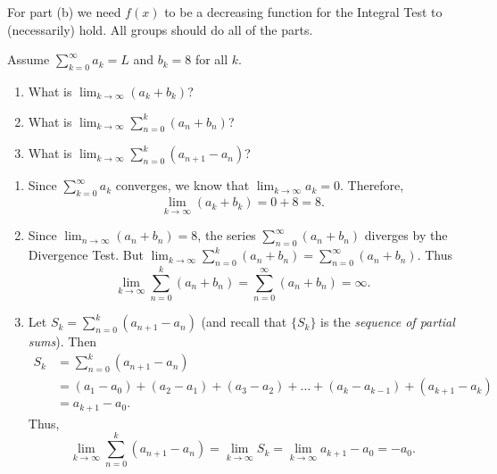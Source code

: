 \documentclass[]{ximera}
\begin{document}
\begin{instructorNotes}
For part (b) we need $f(x)$ to be a decreasing function for the Integral Test to (necessarily) hold.
All groups should do all of the parts.
\end{instructorNotes}







\begin{problem}
Assume $\sum_{k=0}^\infty a_k =L$ and $b_k = 8$ for all $k$. 
	\begin{enumerate}
	
	\item  What is $\lim_{k \to \infty} (a_k + b_k)$?
	
	\item  What is $\lim_{k \to \infty} \sum_{n=0}^k (a_n + b_n)$?
	
	\item  What is $\lim_{k \to \infty} \sum_{n=0}^k (a_{n+1} - a_n)$?
	
	\end{enumerate}
	
	\begin{freeResponse}
		\begin{enumerate}
	
		\item  Since $\sum_{k=0}^\infty a_k$ converges, we know that $\lim_{k \to \infty} a_k = 0$.  
		Therefore,
			\[
			\lim_{k \to \infty} (a_k + b_k) = 0 + 8 = \boxed{8}.
			\]
	
		\item  Since $\lim_{n \to \infty} (a_n + b_n) = 8$, the series $\sum_{n=0}^\infty (a_n + b_n)$ diverges by the Divergence Test.  
		But $\lim_{k \to \infty}  \sum_{n=0}^k (a_n + b_n) = \sum_{n=0}^\infty (a_n + b_n)$.  
		Thus
			\[
			\lim_{k \to \infty}  \sum_{n=0}^k (a_n + b_n) = \sum_{n=0}^\infty (a_n + b_n) = \boxed{\infty}.
			\]
	
		\item  Let $S_k = \sum_{n=0}^k (a_{n+1} - a_n)$ (and recall that $\{ S_k \}$ is the {\it sequence of partial sums}).
		Then
			\begin{align*}
			S_k &= \sum_{n=0}^k (a_{n+1} - a_n)  \\
			&= (a_1 - a_0) + (a_2 - a_1) + (a_3 - a_2) + \hdots + (a_k - a_{k-1}) + (a_{k+1} - a_k)  \\
			&= a_{k+1} - a_0.
			\end{align*}
		Thus,
			\[
			\lim_{k \to \infty} \sum_{n=0}^k (a_{n+1} - a_n) = \lim_{k \to \infty} S_k = \lim_{k \to \infty} a_{k+1} - a_0 = \boxed{-a_0}.
			\]
	
		\end{enumerate}
	\end{freeResponse}
		
\end{problem}
\end{document}
